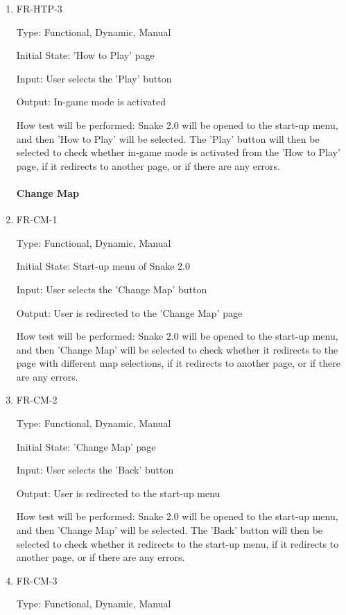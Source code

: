 \documentclass[12pt, titlepage]{article}
\begin{document}
\begin{enumerate}
\item{FR-HTP-3}
\label{fr:htp-3}

Type: Functional, Dynamic, Manual

Initial State: 'How to Play' page 

Input: User selects the 'Play' button

Output: In-game mode is activated

How test will be performed: Snake 2.0 will be opened to the start-up menu, and then 'How to Play' will be selected. The 'Play' button will then be selected to check whether in-game mode is activated from the 'How to Play' page, if it redirects to another page, or if there are any errors.   

\paragraph{Change Map}

\item{FR-CM-1}
\label{fr:cm-1}

Type: Functional, Dynamic, Manual

Initial State: Start-up menu of Snake 2.0 

Input: User selects the 'Change Map' button

Output: User is redirected to the 'Change Map' page

How test will be performed: Snake 2.0 will be opened to the start-up menu, and then 'Change Map' will be selected to check whether it redirects to the page with different map selections, if it redirects to another page, or if there are any errors.   

\item{FR-CM-2}
\label{fr:cm-2}

Type: Functional, Dynamic, Manual

Initial State: 'Change Map' page

Input: User selects the 'Back' button

Output: User is redirected to the start-up menu

How test will be performed: Snake 2.0 will be opened to the start-up menu, and then 'Change Map' will be selected. The 'Back' button will then be selected to check whether it redirects to the start-up menu, if it redirects to another page, or if there are any errors.   

\item{FR-CM-3}
\label{fr:cm-3}

Type: Functional, Dynamic, Manual


\end{enumerate}
\end{document}
